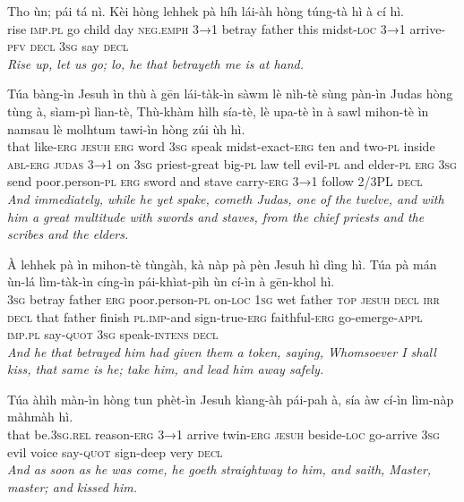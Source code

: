 \documentclass[11pt,a4paper]{article}
\begin{document}
\begin{exe}
\gll Tho ùn; pái tá nì. Kèi hòng lehhek pà híh lái-àh hòng túng-tà hì à cí hì. \\
     rise \textsc{imp}.\textsc{pl} go child day \textsc{neg}.\textsc{emph} \textsc{3→1} betray father this midst-\textsc{loc} \textsc{3→1} arrive-\textsc{pfv} \textsc{decl} \textsc{3sg} say \textsc{decl} \\
\glt \textcolor{kjvcolor}{\textit{Rise up, let us go; lo, he that betrayeth me is at hand.}}

\gll Túa bàng-ìn Jesuh ìn thù à gēn lái-tàk-ìn sàwm lè nìh-tè sùng pàn-ìn Judas hòng tùng à, sìam-pì lìan-tè, Thù-khàm hìlh sía-tè, lè upa-tè ìn à sawl mihon-tè ìn namsau lè molhtum tawi-ìn hòng zúi ùh hì. \\
     that like-\textsc{erg} \textsc{jesuh} \textsc{erg} word \textsc{3sg} speak midst-exact-\textsc{erg} ten and two-\textsc{pl} inside \textsc{abl}-\textsc{erg} \textsc{judas} \textsc{3→1} on \textsc{3sg} priest-great big-\textsc{pl} law tell evil-\textsc{pl} and elder-\textsc{pl} \textsc{erg} \textsc{3sg} send poor.person-\textsc{pl} \textsc{erg} sword and stave carry-\textsc{erg} \textsc{3→1} follow 2/3PL \textsc{decl} \\
\glt \textcolor{kjvcolor}{\textit{And immediately, while he yet spake, cometh Judas, one of the twelve, and with him a great multitude with swords and staves, from the chief priests and the scribes and the elders.}}

\gll À lehhek pà ìn mihon-tè tùngàh, kà nàp pà pèn Jesuh hì dìng hì. Túa pà mán ùn-lá lìm-tàk-ìn cíng-ìn pái-khìat-pìh ùn cí-ìn à gēn-khol hì. \\
     \textsc{3sg} betray father \textsc{erg} poor.person-\textsc{pl} on-\textsc{loc} \textsc{1sg} wet father \textsc{top} \textsc{jesuh} \textsc{decl} \textsc{irr} \textsc{decl} that father finish \textsc{pl}.\textsc{imp}-and sign-true-\textsc{erg} faithful-\textsc{erg} go-emerge-\textsc{appl} \textsc{imp}.\textsc{pl} say-\textsc{quot} \textsc{3sg} speak-\textsc{intens} \textsc{decl} \\
\glt \textcolor{kjvcolor}{\textit{And he that betrayed him had given them a token, saying, Whomsoever I shall kiss, that same is he; take him, and lead him away safely.}}

\gll Túa àhìh màn-ìn hòng tun phèt-ìn Jesuh kìang-àh pái-pah à, sía àw cí-ìn lìm-nàp màhmàh hì. \\
     that be.\textsc{3sg}.\textsc{rel} reason-\textsc{erg} \textsc{3→1} arrive twin-\textsc{erg} \textsc{jesuh} beside-\textsc{loc} go-arrive \textsc{3sg} evil voice say-\textsc{quot} sign-deep very \textsc{decl} \\
\glt \textcolor{kjvcolor}{\textit{And as soon as he was come, he goeth straightway to him, and saith, Master, master; and kissed him.}}


\end{exe}
\end{document}
